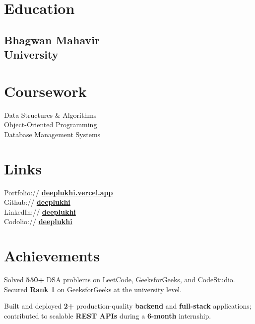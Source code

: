 \documentclass[]{deedy-resume-openfont}
\begin{document}
\begin{minipage}[t]{0.33\textwidth}
\section{Education}

\subsection{Bhagwan Mahavir\\University}
\sectionsep


\section{Coursework}
Data Structures \& Algorithms \\
Object-Oriented Programming \\
Database Management Systems \\
\sectionsep


\section{Links}
Portfolio:// \href{https://deeplukhi.vercel.app/}{\bf deeplukhi.vercel.app} \\
Github:// \href{https://github.com/deeplukhi}{\bf deeplukhi} \\
LinkedIn:// \href{https://www.linkedin.com/in/deeplukhi/}{\bf deeplukhi} \\
Codolio:// \href{https://codolio.com/profile/deeplukhi}{\bf deeplukhi}
\sectionsep


\section{Achievements}
\textbullet{} Solved \textbf{550+} DSA problems on LeetCode,
GeeksforGeeks, and CodeStudio. Secured \textbf{Rank 1} on
GeeksforGeeks at the university level.

\textbullet{} Built and deployed \textbf{2+} production-quality
\textbf{backend} and \textbf{full-stack} applications; contributed
to scalable \textbf{REST APIs} during a \textbf{6-month} internship.
\sectionsep

%
%

\end{minipage}
\end{document}
